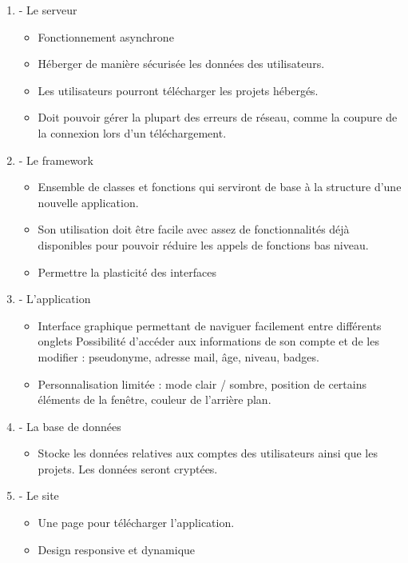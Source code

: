 \documentclass{report}
\begin{document}
\begin{enumerate}[I]
    \item - Le serveur
        \begin{itemize}
        \item Fonctionnement asynchrone
        \item Héberger de manière sécurisée les données des utilisateurs.
        \item Les utilisateurs pourront télécharger les projets hébergés.
        \item Doit pouvoir gérer la plupart des erreurs de réseau, comme la coupure de la
        connexion lors d’un téléchargement.
        \end{itemize}
    \item - Le framework
        \begin{itemize}
        \item Ensemble de classes et fonctions qui serviront de base à la structure d’une nouvelle
    application.
        \item Son utilisation doit être facile avec assez de fonctionnalités déjà disponibles pour
        pouvoir réduire les appels de fonctions bas niveau.
        \item Permettre la plasticité des interfaces
        \end{itemize}
    \item - L’application
        \begin{itemize}
            \item Interface graphique permettant de naviguer facilement entre différents onglets
        Possibilité d'accéder aux informations de son compte et de les modifier :
        pseudonyme, adresse mail, âge, niveau, badges.
            \item Personnalisation limitée : mode clair / sombre, position de certains éléments de la
        fenêtre, couleur de l’arrière plan.
        \end{itemize}
    \item - La base de données
        \begin{itemize}
            \item Stocke les données relatives aux comptes des utilisateurs ainsi que les projets.
        Les données seront cryptées.
        \end{itemize}
    \item - Le site
        \begin{itemize}
            \item Une page pour télécharger l’application.
            \item Design responsive et dynamique
        \end{itemize}
\end{enumerate}
\end{document}
